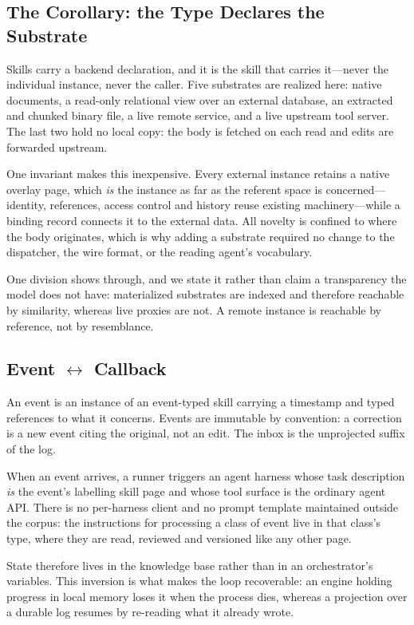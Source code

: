 \documentclass[journal,nofonttune]{IEEEtran}
\begin{document}
\subsection{The Corollary: the Type Declares the Substrate}
\label{sec:corollary}
Skills carry a backend declaration, and it is the skill that carries
it---never the individual instance, never the caller. Five substrates are
realized here: native documents, a read-only relational view over an external
database, an extracted and chunked binary file, a live remote service, and a
live upstream tool server. The last two hold no local copy: the body is
fetched on each read and edits are forwarded upstream.

One invariant makes this inexpensive. Every external instance retains a
native overlay page, which \emph{is} the instance as far as the referent
space is concerned---identity, references, access control and history reuse
existing machinery---while a binding record connects it to the external data.
All novelty is confined to where the body originates, which is why adding a
substrate required no change to the dispatcher, the wire format, or the
reading agent's vocabulary.

One division shows through, and we state it rather than claim a transparency
the model does not have: materialized substrates are indexed and therefore
reachable by similarity, whereas live proxies are not. A remote instance is
reachable by reference, not by resemblance.

\subsection{Event $\leftrightarrow$ Callback}
An event is an instance of an event-typed skill carrying a timestamp and
typed references to what it concerns. Events are immutable by convention: a
correction is a new event citing the original, not an edit. The inbox is the
unprojected suffix of the log.

When an event arrives, a runner triggers an agent harness whose task
description \emph{is} the event's labelling skill page and whose tool surface
is the ordinary agent API. There is no per-harness client and no prompt
template maintained outside the corpus: the instructions for processing a
class of event live in that class's type, where they are read, reviewed and
versioned like any other page.

State therefore lives in the knowledge base rather than in an orchestrator's
variables. This inversion is what makes the loop recoverable: an engine
holding progress in local memory loses it when the process dies, whereas a
projection over a durable log resumes by re-reading what it already wrote.
\end{document}
